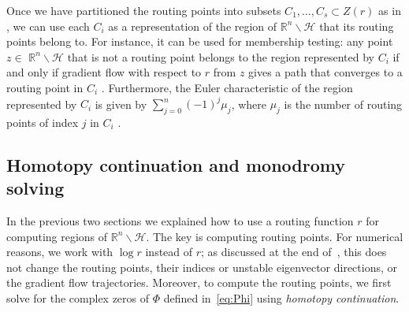 \documentclass[11pt]{article}
\numberwithin{equation}{section}
\theoremstyle{plain}
\theoremstyle{definition}
\theoremstyle{remark}
\newcommand{\sH}{{\mathcal H}}
\newcommand\bR{{\mathbb R}}
\begin{document}
Once we have partitioned the routing points into subsets $C_1,\ldots,C_s\subset Z(r)$ as in , we can use each $C_i$ as a representation of the region of $\bR^{n}\smallsetminus \sH$ that its routing points belong to. For instance, it can be used for membership testing: any point $z\in$  $\bR^{n}\smallsetminus \sH$ that is not a routing point belongs to the region represented by $C_i$ if and only if gradient flow with respect to $r$ from $z$ gives a path that converges to a routing point in $C_i$  \cite[Proposition~4.1]{SmoothConnectivity}. Furthermore, the Euler characteristic of the region represented by $C_i$ is given by $\sum_{j=0}^n (-1)^j\mu_j$, where $\mu_j$
is the number of routing points of index $j$ in $C_i$ \cite[Theorem~3.8]{SmoothConnectivity}.

\subsection{Homotopy continuation and monodromy solving}\label{sec:HCMonodromy}

In the previous two sections we explained how to use a routing function $r$ for computing regions of $\bR^{n}\smallsetminus \sH$. The key is computing routing points. For numerical reasons, we work with $\log r$ instead of $r$; as discussed at the end of~, this does not change the routing points, their indices or unstable eigenvector directions, or the gradient flow trajectories. Moreover, to compute the routing points, we first solve for the complex zeros of $\Phi$ defined in~\eqref{eq:Phi} using \textit{homotopy continuation}.
\end{document}
